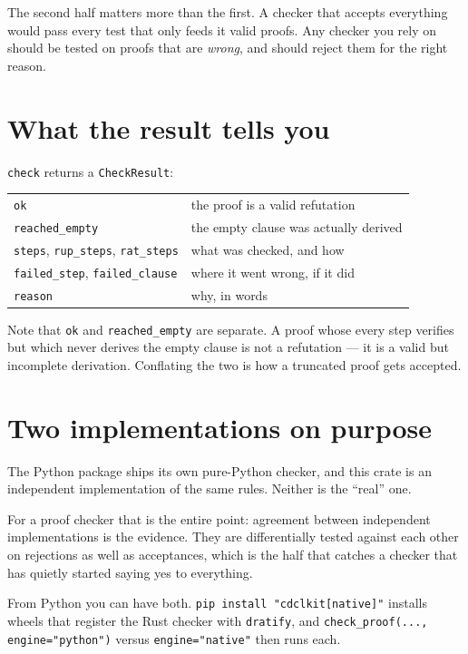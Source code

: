 \documentclass[11pt,a4paper]{article}
\newcommand{\pkg}[1]{\texttt{#1}}
\begin{document}
The second half matters more than the first. A checker that accepts everything
would pass every test that only feeds it valid proofs. Any checker you rely on
should be tested on proofs that are \emph{wrong}, and should reject them for
the right reason.

\section{What the result tells you}

\texttt{check} returns a \texttt{CheckResult}:

\begin{center}
\begin{tabular}{ll}
\toprule
\texttt{ok} & the proof is a valid refutation \\
\texttt{reached\_empty} & the empty clause was actually derived \\
\texttt{steps}, \texttt{rup\_steps}, \texttt{rat\_steps} & what was checked, and how \\
\texttt{failed\_step}, \texttt{failed\_clause} & where it went wrong, if it did \\
\texttt{reason} & why, in words \\
\bottomrule
\end{tabular}
\end{center}

Note that \texttt{ok} and \texttt{reached\_empty} are separate. A proof whose
every step verifies but which never derives the empty clause is not a
refutation --- it is a valid but incomplete derivation. Conflating the two is
how a truncated proof gets accepted.

\section{Two implementations on purpose}

The Python package ships its own pure-Python checker, and this crate is an
independent implementation of the same rules. Neither is the ``real'' one.

For a proof checker that is the entire point: agreement between independent
implementations is the evidence. They are differentially tested against each
other on rejections as well as acceptances, which is the half that catches a
checker that has quietly started saying yes to everything.

From Python you can have both. \texttt{pip install "cdclkit[native]"} installs
wheels that register the Rust checker with \pkg{dratify}, and
\texttt{check\_proof(..., engine="python")} versus \texttt{engine="native"}
then runs each.
\end{document}
